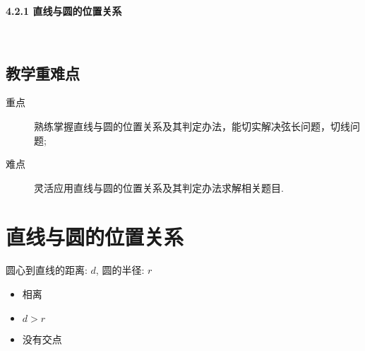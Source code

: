 \documentclass[10pt,a4paper]{article}
\begin{document}
\centerline{\Large{\textbf{4.2.1 直线与圆的位置关系}}}





　　		\subsection{教学重难点}

			\begin{description}

				\item[重点] 熟练掌握直线与圆的位置关系及其判定办法，能切实解决弦长问题，切线问题;

				\item[难点] 灵活应用直线与圆的位置关系及其判定办法求解相关题目.

			\end{description}

\section{直线与圆的位置关系}

圆心到直线的距离: $d$, 圆的半径: $r$\vspace{20pt}

\begin{minipage}{0.3\textwidth}
\end{minipage}
\begin{minipage}{0.7\textwidth}
		\begin{itemize}
			\item 相离
			\item $d>r$
			\item 没有交点
		\end{itemize}
\end{minipage}
\end{document}
